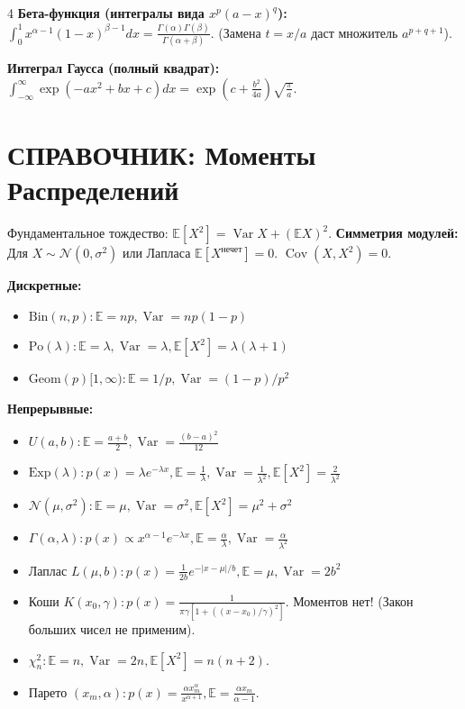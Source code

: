 \documentclass[a4paper, landscape]{article}
\newcommand{\E}{\mathbb{E}}
\newcommand{\N}{\mathcal{N}}
\DeclareMathOperator{\Var}{Var}
\DeclareMathOperator{\Cov}{Cov}
\begin{document}
\begin{multicols*}{4}
\textbf{Бета-функция (интегралы вида $x^p(a-x)^q$):}
$\int_0^1 x^{\alpha-1} (1-x)^{\beta-1} dx = \frac{\Gamma(\alpha)\Gamma(\beta)}{\Gamma(\alpha+\beta)}$.
(Замена $t = x/a$ даст множитель $a^{p+q+1}$).

\textbf{Интеграл Гаусса (полный квадрат):}
$\int_{-\infty}^\infty \exp\left( -ax^2 + bx + c \right) dx = \exp\left(c + \frac{b^2}{4a}\right) \sqrt{\frac{\pi}{a}}$.

\section*{СПРАВОЧНИК: Моменты Распределений}
Фундаментальное тождество: $\E[X^2] = \Var X + (\E X)^2$. 
\textbf{Симметрия модулей:} Для $X \sim \N(0, \sigma^2)$ или Лапласа $\E[X^{\text{нечет}}]=0$. $\Cov(X, X^2)=0$.

\textbf{Дискретные:}
\begin{itemize}
    \item $\text{Bin}(n, p): \E = np, \Var = np(1-p)$
    \item $\text{Po}(\lambda): \E = \lambda, \Var = \lambda, \E[X^2] = \lambda(\lambda+1)$
    \item $\text{Geom}(p) [1, \infty): \E = 1/p, \Var = (1-p)/p^2$
\end{itemize}
\textbf{Непрерывные:}
\begin{itemize}
    \item $U(a,b): \E = \frac{a+b}{2}, \Var = \frac{(b-a)^2}{12}$
    \item $\text{Exp}(\lambda): p(x) = \lambda e^{-\lambda x}, \E = \frac{1}{\lambda}, \Var = \frac{1}{\lambda^2}, \E[X^2] = \frac{2}{\lambda^2}$
    \item $\N(\mu, \sigma^2): \E = \mu, \Var = \sigma^2, \E[X^2] = \mu^2+\sigma^2$
    \item $\Gamma(\alpha, \lambda): p(x) \propto x^{\alpha-1} e^{-\lambda x}, \E = \frac{\alpha}{\lambda}, \Var = \frac{\alpha}{\lambda^2}$
    \item Лаплас $L(\mu, b): p(x) = \frac{1}{2b}e^{-|x-\mu|/b}, \E = \mu, \Var = 2b^2$
    \item Коши $K(x_0, \gamma): p(x) = \frac{1}{\pi\gamma[1+((x-x_0)/\gamma)^2]}$. Моментов нет! (Закон больших чисел не применим).
    \item $\chi^2_n: \E=n, \Var=2n, \E[X^2]=n(n+2)$.
    \item Парето $(x_m, \alpha): p(x) = \frac{\alpha x_m^\alpha}{x^{\alpha+1}}, \E = \frac{\alpha x_m}{\alpha-1}$.
\end{itemize}

\end{multicols*}
\end{document}
